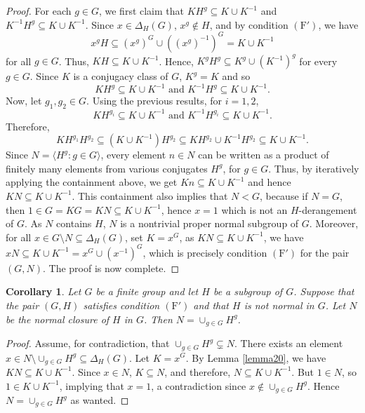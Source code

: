 \documentclass[twoside,a4paper,reqno,11pt]{amsart}
\newcommand{\<}{\langle}
\renewcommand{\>}{\rangle}
\newcommand{\la}{\langle}
\newcommand{\ra}{\rangle}
\newcommand{\Fp}{\mathrm{(F')}}
\renewcommand{\:}{\colon}
\newtheorem{cor}[thm]{Corollary}
\theoremstyle{definition}
\begin{document}
\begin{proof}
	For each $g\in G$, we first claim that $KH^g\subseteq K\cup K^{-1}$ and $K^{-1}H^g \subseteq K\cup K^{-1}$. Since $x\in \Delta_H(G)$, $x^g \notin H$, and by condition $\Fp$,  we have $$x^gH\subseteq (x^g)^{G}\cup \left((x^g)^{-1}\right)^G = K\cup K^{-1}$$ for all $g\in G$. Thus,  $KH\subseteq K\cup K^{-1}$. Hence, $K^gH^g \subseteq K^g\cup (K^{-1})^g$ for every $g\in G$. Since $K$ is a conjugacy class of $G$, $K^g = K$ and so $$KH^g \subseteq K\cup K^{-1} \text{ and }K^{-1}H^g \subseteq K\cup K^{-1}.$$ Now, let $g_1, g_2\in G$. Using the previous results, for $i=1,2$,  $$KH^{g_i} \subseteq K\cup K^{-1}\text{ and }K^{-1}H^{g_i}\subseteq K\cup K^{-1}.$$  Therefore, 
	\[	KH^{g_1}H^{g_2}\subseteq (K\cup K^{-1})H^{g_2} \subseteq KH^{g_2} \cup K^{-1}H^{g_2} \subseteq K\cup K^{-1}.\]
	Since $N = \la H^{g}:g\in G\ra$, every element $n\in N$ can be written as a product of finitely many  elements from various  conjugates  $H^g$, for  $g\in G$. Thus, by iteratively applying the containment above, we get  $Kn \subseteq K\cup K^{-1}$ and hence $KN \subseteq K\cup K^{-1}$. This containment also implies that $N<G$, because if $N=G$, then $1\in G= KG = KN \subseteq K \cup K^{-1}$, hence $x=1$ which is not an $H$-derangement of $G$. As $N$ contains $H$, $N$ is a nontrivial proper normal subgroup of $G$.
	Moreover, for all $x\in G\setminus N \subseteq \Delta_H(G)$, set $K = x^G$, as $KN \subseteq K\cup K^{-1}$, we have  $xN \subseteq K\cup K^{-1}=  x^G \cup (x^{-1})^G$, which is precisely condition $\Fp$ for the pair $(G,N)$. The proof is now complete.
\end{proof}


\begin{cor}\label{corol22}
Let $G$ be a finite group and let $H$ be a subgroup of $G$.	Suppose that the pair $(G,H)$ satisfies condition $\Fp$ and that $H$ is not normal in $G$. Let $N$ be the normal closure of $H$ in $G$. Then $N = \cup_{g\in G}H^g$. 
\end{cor}
\begin{proof}
	Assume, for contradiction,  that $\cup_{g\in G}H^g\subsetneq N$. There exists an element $x \in N\setminus \cup_{g\in G}H^g \subseteq \Delta_H(G)$. Let $K = x^G$. By Lemma \ref{lemma20}, we have $KN\subseteq K\cup K^{-1}$. Since $x\in N$,  $K\subseteq N$, and therefore, $N \subseteq K\cup K^{-1}$. But $1\in N$, so $1\in  K\cup K^{-1}$, implying that  $x = 1$, a contradiction since $x\not\in \cup_{g\in G}H^g$. Hence   $ N= \cup_{g\in G}H^g$ as wanted.
\end{proof}
\end{document}
